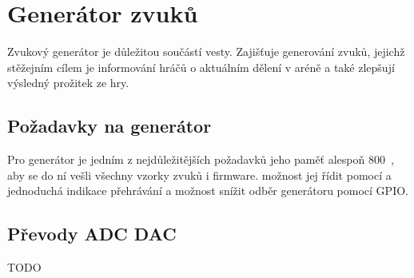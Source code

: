 \chapter{Generátor zvuků}
Zvukový generátor je důležitou součástí  vesty. Zajišťuje generování zvuků, jejichž stěžejním cílem je informování hráčů o aktuálním dělení v aréně a také zlepšují výsledný prožitek ze hry.

\section{Požadavky na generátor}
Pro generátor je jedním z nejdůležitějších požadavků jeho paměť alespoň 800~, aby se do ní vešli všechny vzorky zvuků i firmware.  možnost jej řídit pomocí  a jednoduchá indikace přehrávání a možnost snížit odběr generátoru pomocí GPIO.

\section{Převody ADC DAC}
TODO



